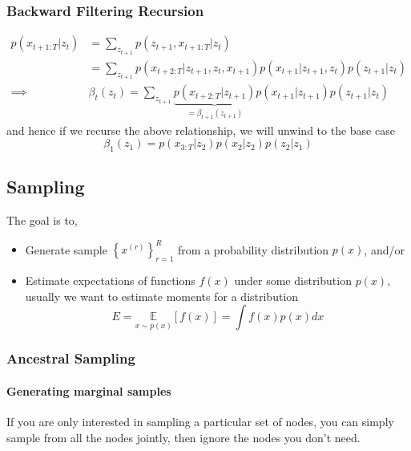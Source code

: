 \documentclass[11pt]{article}
\begin{document}
\subsubsection{Backward Filtering Recursion}
\begin{align}
    p\left(x_{t+1: T} | z_{t}\right)
    &=\sum_{z_{t+1}} p\left(z_{t+1}, x_{t+1: T} | z_{t}\right) \\
    &= \sum_{z_{t+1}} p\left(x_{t+2: T} | z_{t+1}, z_{t}, x_{t+1}\right) p\left(x_{t+1} | z_{t+1}, z_{t}\right) p\left(z_{t+1} | z_{t}\right) \\
    \implies &\beta_{t}\left(z_{t}\right)=\sum_{z_{t+1}} \underbrace{ p\left(x_{t+2 : T} | z_{t+1}\right)}_{ = \beta_{t +1}(z_{t + 1})} p\left(x_{t+1} | z_{t+1}\right) p\left(z_{t+1} | z_{t}\right)
\end{align}
and hence if we recurse the above relationship, we will unwind to the base case
\begin{equation}
    \beta_{1}\left(z_{1}\right)=p\left(x_{3: T} | z_{2}\right) p\left(x_{2} | z_{2}\right) p\left(z_{2} | z_{1}\right)
\end{equation}


\subsection{Sampling}
The goal is to, 
\begin{itemize}
    \item Generate sample $\left\{x^{(r)}\right\}_{r=1}^{R}$ from a probability distribution $p(x)$, and/or
    \item Estimate expectations of functions $f(x)$ under some distribution $p(x)$, usually we want to estimate moments for a distribution
    \begin{equation}
        E=\underset{x \sim p(x)}{\mathbb{E}}[f(x)]=\int f(x) p(x) d x
    \end{equation}
\end{itemize}

\subsubsection{Ancestral Sampling}
\paragraph{Generating marginal samples} If you are only interested in sampling a particular set of nodes, you can simply sample from all the nodes jointly, then ignore the nodes you don't need.
\end{document}
